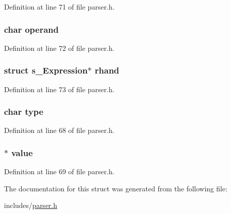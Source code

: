 Definition at line 71 of file parser.\+h.

\hypertarget{structs___expression_a3cad0d01b06faaf8fa705cf1e62daaa1}{
\subsubsection[{operand}]{\setlength{\rightskip}{0pt plus 5cm}char operand}}\label{structs___expression_a3cad0d01b06faaf8fa705cf1e62daaa1}


Definition at line 72 of file parser.\+h.

\hypertarget{structs___expression_a89f69d4913e564bf65840ac6e72c7a71}{
\subsubsection[{rhand}]{\setlength{\rightskip}{0pt plus 5cm}struct {\bf s\+\_\+\+Expression}$\ast$ rhand}}\label{structs___expression_a89f69d4913e564bf65840ac6e72c7a71}


Definition at line 73 of file parser.\+h.

\hypertarget{structs___expression_aff17911edc8208aa8ddb1c7c52c78389}{
\subsubsection[{type}]{\setlength{\rightskip}{0pt plus 5cm}char type}}\label{structs___expression_aff17911edc8208aa8ddb1c7c52c78389}


Definition at line 68 of file parser.\+h.

\hypertarget{structs___expression_a5968898e6cdff4827c971a18ee650c7e}{
\subsubsection[{value}]{$\ast$ value}}\label{structs___expression_a5968898e6cdff4827c971a18ee650c7e}


Definition at line 69 of file parser.\+h.



The documentation for this struct was generated from the following file\+:\begin{DoxyCompactItemize}
\item 
includes/\hyperlink{parser_8h}{parser.\+h}\end{DoxyCompactItemize}
